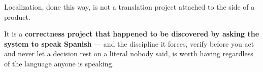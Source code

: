 Localization, done this way, is not a translation project attached to the side of a
product.

\begin{keyinsight}
It is a \textbf{correctness project that happened to be discovered by asking the system
to speak Spanish} --- and the discipline it forces, verify before you act and never let a
decision rest on a literal nobody said, is worth having regardless of the language anyone
is speaking.
\end{keyinsight}
